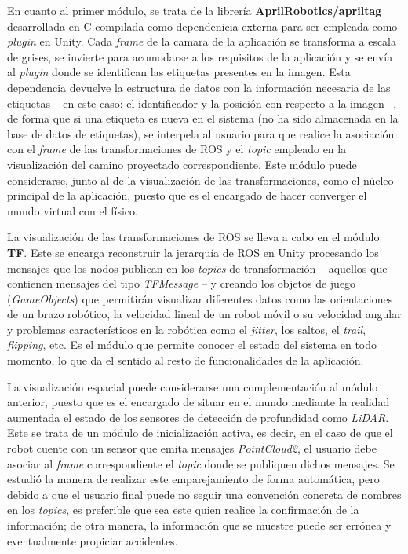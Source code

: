 En cuanto al primer módulo, se trata de la librería \textbf{AprilRobotics/apriltag} desarrollada en C compilada como 
dependenicia externa para ser empleada como \textit{plugin} en Unity. Cada \textit{frame} de la camara de la aplicación se transforma 
a escala de grises, se invierte para acomodarse a los requisitos de la aplicación y se envía al \textit{plugin} donde se identifican 
las etiquetas presentes en la imagen. Esta dependencia devuelve la estructura de datos con la información necesaria de las etiquetas
-- en este caso: el identificador y la posición con respecto a la imagen --, de forma que si una etiqueta es nueva en el sistema 
(no ha sido almacenada en la base de datos de etiquetas), se interpela al usuario para que realice la asociación con el \textit{frame} de las
transformaciones de ROS y el \textit{topic} empleado en la visualización del camino proyectado correspondiente. Este módulo puede considerarse,
junto al de la visualización de las transformaciones, como el núcleo principal de la aplicación, puesto que es el encargado de hacer 
converger el mundo virtual con el físico.

La visualización de las transformaciones de ROS se lleva a cabo en el módulo \textbf{TF}. Este se encarga  reconstruir la jerarquía de ROS en Unity 
procesando los mensajes que los nodos publican en los \textit{topics} de transformación -- aquellos que contienen mensajes del tipo \textit{TFMessage} --
y creando los objetos de juego (\textit{GameObjects}) que permitirán visualizar diferentes datos como las orientaciones de un brazo robótico, la velocidad
lineal de un robot móvil o su velocidad angular y problemas característicos en la robótica como el \textit{jitter}, los saltos, el \textit{trail}, \textit{flipping}, etc.
Es el módulo que permite conocer el estado del sistema en todo momento, lo que da el sentido al resto de funcionalidades de la aplicación.

La visualización espacial puede considerarse una complementación al módulo anterior, puesto que es el encargado de situar en el mundo mediante la realidad aumentada 
el estado de los sensores de detección de profundidad como \textit{LiDAR}. Este se trata de un módulo de inicialización activa, es decir, en el caso de que el robot cuente 
con un sensor que emita mensajes \textit{PointCloud2}, el usuario debe asociar al \textit{frame} correspondiente el \textit{topic} donde se publiquen dichos mensajes.
Se estudió la manera de realizar este emparejamiento de forma automática, pero debido a que el usuario final puede no seguir una convención concreta de nombres
en los \textit{topics}, es preferible que sea este quien realice la confirmación de la información; de otra manera, la información que se muestre puede ser errónea y 
eventualmente propiciar accidentes.

